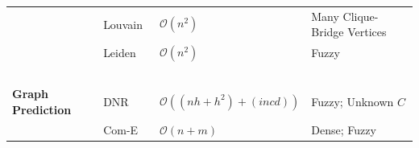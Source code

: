 \begin{landscape}
\begin{table}[t]
{\begin{tabular}{l|lll}
                                                    
                                                    & Louvain~\cite{Blondel2008}                        & $\mathcal{O}(n^2)$                        & Many Clique-Bridge Vertices\\ %
                                                    
                                                    & Leiden~\cite{Traag2019}                           & $\mathcal{O}(n^2)$                        & Fuzzy  \\%
                                                                                     
                                                    
                        ~                           &                         ~                         &        ~                                  & ~ \\          
                                             
        \textbf{Graph Prediction}                   & DNR~\cite{Yang2016}                               & $\mathcal{O}((nh+h^2)+(incd))$            & Fuzzy; Unknown $C$ \\ %
                                                                                       
                                                    & Com-E~\cite{Cavallari2017}                        & $\mathcal{O}(n + m)$                      & Dense; Fuzzy \\
                                            

\end{tabular}}
\end{table}
\end{landscape}
